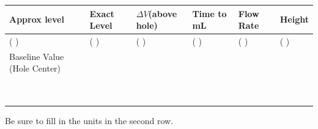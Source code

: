 \newpage
\renewcommand{\arraystretch}{1.4}

\begin{center}
\begin{tabular}{|p{2.5cm}|p{2.5cm}|p{2.5cm}|p{2.5cm}|p{2.5cm}|p{2.5cm}|}
\hline
\textbf{Approx level} &
\textbf{Exact Level} &
\textbf{$\Delta V$}\newline (above hole) &
\textbf{Time to \newline25 mL} &
\textbf{Flow Rate} &
\textbf{Height} \\
\hline
 (  \hspace{1cm} )  & (  \hspace{1cm} )  &(  \hspace{1cm} ) & (  \hspace{1cm} ) & (  \hspace{1cm} )  & (  \hspace{1cm} )  \\   %
\hline
\hline
Baseline Value (Hole Center) &  &  \cellcolor{gray!90}  &  \cellcolor{gray!90} &  \cellcolor{gray!90}   &  \cellcolor{gray!90}  \\[1.5em]
\hline
 & & & & & \\[1.5em]
\hline
 & & & & & \\[1.5em]
\hline
 & & & & & \\[1.5em]
\hline
 & & & & & \\[1.5em]
\hline
 & & & & & \\[1.5em]
\hline
 & & & & & \\[1.5em]
\hline
 & & & & & \\[1.5em]
\hline
 & & & & & \\[1.5em]
\hline
 & & & & & \\[1.5em]
\hline
\end{tabular}
\end{center}
Be sure to fill in the units in the second row.








 